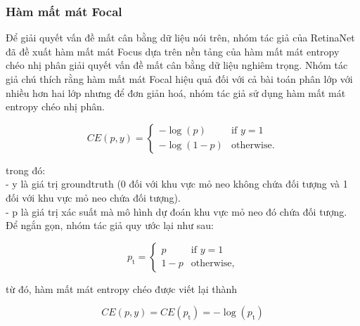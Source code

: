 {    \subsubsection*{Hàm mất mát Focal}
    Để giải quyết vấn đề mất cân bằng dữ liệu nói trên, nhóm tác giả của RetinaNet đã đề xuất hàm mất mát Focus dựa trên nền tảng của hàm mất mát entropy chéo nhị phân giải quyết vấn đề mất cân bằng dữ liệu nghiêm trọng.
    Nhóm tác giả chú thích rằng hàm mất mát Focal hiệu quả đối với cả bài toán phân lớp với nhiều hơn hai lớp nhưng để đơn giản hoá, nhóm tác giả sử dụng hàm mất mát entropy chéo nhị phân.

    \begin{equation}
        \label{eq:bce}
        CE(p,y) = 
        \begin{cases}
            -\log(p) &\text{if $y = 1$} \\
            -\log (1 - p) &\text{otherwise.}
        \end{cases}
    \end{equation}

    \noindent
    trong đó: \\
    - y là giá trị groundtruth (0 đối với khu vực mỏ neo không chứa đối tượng và 1 đối với khu vực mỏ neo chứa đối tượng). \\
    - p là giá trị xác suất mà mô hình dự đoán khu vực mỏ neo đó chứa đối tượng. \\
    Để ngắn gọn, nhóm tác giả quy ước lại như sau:

    \begin{equation}
        \label{eq:bce}
        p_\textrm{t} =
        \begin{cases}
            p &\text{if $y = 1$} \\
            1 - p &\text{otherwise,}
        \end{cases}
    \end{equation}

    \noindent
    từ đó, hàm mất mát entropy chéo được viết lại thành

    \begin{equation}
        CE(p,y) = CE(p_\textrm{t}) = - \log (p_\textrm{t})
    \end{equation}

}
